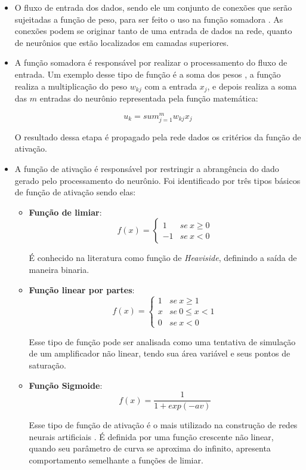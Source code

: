 \begin{itemize}
\item O fluxo de entrada dos dados, sendo ele um conjunto de conexões que serão sujeitadas a função de peso, para ser feito o uso na função somadora \cite{haykin2001}. As conexões podem se originar tanto de uma entrada de dados na rede, quanto de neurônios que estão localizados em camadas superiores.
\item A função somadora é responsável por realizar o processamento do fluxo de entrada.
Um exemplo desse tipo de função é a soma dos pesos \cite{Kriesel2007NeuralNetworks}, a função realiza a multiplicação do peso $w_{kj}$ com a entrada $x_j$, e depois realiza a soma das $m$ entradas do neurônio representada pela função matemática:
\par \[u_k = sum_{j=1}^{m} w_{kj}x_j\]
\par O resultado dessa etapa é propagado pela rede dados os critérios da função de ativação.
\item A função de ativação é responsável por restringir a abrangência do dado gerado pelo processamento do neurônio. Foi identificado por  três tipos básicos de função de ativação sendo elas:
  \begin{itemize}
    \item \textbf{Função de limiar}:
\[ f(x)= \begin{cases} 1&se \ x \ge 0 \\ -1 & se\ x < 0 \end{cases} \]
      \par É conhecido na literatura como função de \textit{Heaviside}, definindo a saída de maneira binaria.
    \item \textbf{Função linear por partes}: 
\[ f(x)= \begin{cases} 1&se \ x \ge 1 \\x & se\ 0\le x < 1 \\ 0 & se\ x < 0 \end{cases} \]
      \par Esse tipo de função pode ser analisada como uma tentativa de simulação de um amplificador não linear, tendo sua área variável e seus pontos de saturação. 
    \item \textbf{Função Sigmoide}: 
\[ f(x)= \frac{1}{1 + exp(-av)} \]
      \par Esse tipo de função de ativação é o mais utilizado na construção de redes neurais artificiais \cite{haykin2001}. É definida por uma função crescente não linear, quando seu parâmetro de curva se aproxima do infinito, apresenta comportamento semelhante a funções de limiar.
  \end{itemize}
\end{itemize}
